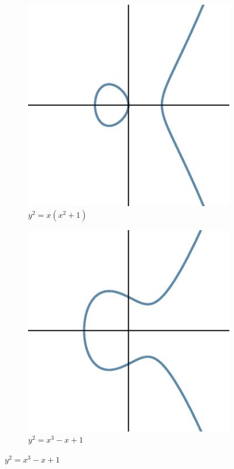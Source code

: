 \begin{frame}[plain]
	\begin{figure}[h]
	\centering
	\begin{subfigure}{0.45\textwidth}
	\includegraphics[width=\textwidth]{images/ec2.eps}
	\caption*{$y^2=x(x^2+1)$}
	\end{subfigure}
	\begin{subfigure}{0.45\textwidth}
	\includegraphics[width=\textwidth]{images/ec1.eps}
	\caption*{$y^2=x^3-x+1$}
	\end{subfigure}
	\end{figure}
\end{frame}





